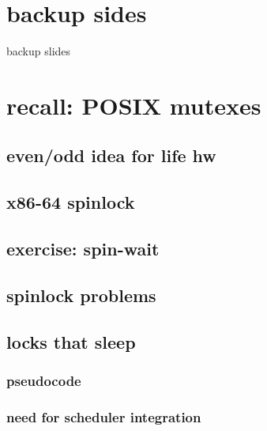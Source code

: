 

\section{backup sides}
\begin{frame}{}
\end{frame}

\begin{frame}{backup slides}
\end{frame}
\section{recall: POSIX mutexes}


\subsection{even/odd idea for life hw}


\subsection{x86-64 spinlock}


\subsection{exercise: spin-wait}


\subsection{spinlock problems}


\subsection{locks that sleep}



\subsubsection{pseudocode}


\subsubsection{need for scheduler integration}



